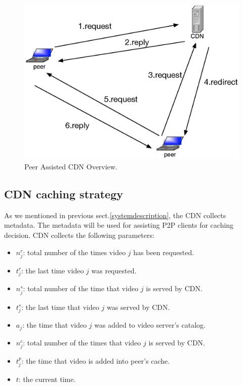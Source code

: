\documentclass[conference]{IEEEtran}
\begin{document}
\begin{figure}[th]
\begin{center}
\includegraphics[scale=0.6]{graphs/p2p-system-description.eps}
\end{center}
\caption{Peer Assisted CDN Overview.}
\label{fig:p2pcdnoverview}
\vspace{-2mm}
\end{figure} 




\subsection{CDN caching strategy}\label{cdncachingstrategy}
As we mentioned in previous sect.\ref{systemdescription}, the CDN collects metadata.
The metadata will be used for assisting P2P clients for caching decision. 
CDN collects the following parameters:
\begin{itemize}
\item $n_j^r$: total number of the times video $j$ has been requested.  
\item $t_j^r$: the last time video $j$ was requested.
\item $n_j^s$: total number of the time that video $j$ is served by CDN.
\item $t_j^s$: the last time that video $j$ was served by CDN.
\item $a_j$: the time that video $j$ was added to video server's catalog.
\item $n_j^c$: total number of the times that video $j$ is served by CDN.
\item $t_j^p$: the time that video  is added into peer's cache.
\item $t$: the current time.
\end{itemize}
\end{document}
